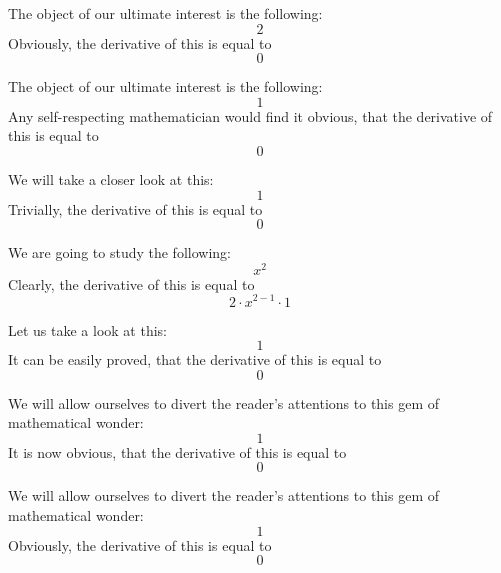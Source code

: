 \documentclass{article}
\begin{document}
The object of our ultimate interest is the following:
\begin{equation}
2 
\end{equation}
Obviously, the derivative of this is equal to
\begin{equation}
0 
\end{equation}

The object of our ultimate interest is the following:
\begin{equation}
1 
\end{equation}
Any self-respecting mathematician would find it obvious, that the derivative of this is equal to
\begin{equation}
0 
\end{equation}

We will take a closer look at this:
\begin{equation}
1 
\end{equation}
Trivially, the derivative of this is equal to
\begin{equation}
0 
\end{equation}

We are going to study the following:
\begin{equation}
x ^{2 } 
\end{equation}
Clearly, the derivative of this is equal to
\begin{equation}
2 \cdot x ^{2 - 1 } \cdot 1 
\end{equation}

Let us take a look at this:
\begin{equation}
1 
\end{equation}
It can be easily proved, that the derivative of this is equal to
\begin{equation}
0 
\end{equation}

We will allow ourselves to divert the reader's attentions to this gem of mathematical wonder:
\begin{equation}
1 
\end{equation}
It is now obvious, that the derivative of this is equal to
\begin{equation}
0 
\end{equation}

We will allow ourselves to divert the reader's attentions to this gem of mathematical wonder:
\begin{equation}
1 
\end{equation}
Obviously, the derivative of this is equal to
\begin{equation}
0 
\end{equation}
\end{document}
